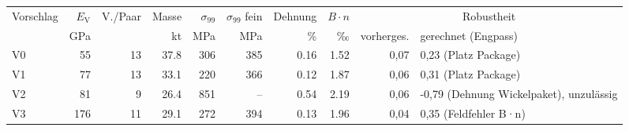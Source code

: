 \begin{tabular}{@{}lrrrrrrrrl@{}}\toprule
Vorschlag & $E_\text{V}$ & V./Paar & Masse & $\sigma_{99}$ & $\sigma_{99}$ fein & Dehnung & $B\cdot n$ & \multicolumn{2}{c}{Robustheit} \\
 & GPa & & kt & MPa & MPa & \% & ‰ & vorherges. & gerechnet (Engpass) \\\midrule
V0 & \num{55} & 13 & \num{37.8} & \num{306} & \num{385} & \num{0.16} & \num{1.52} & 0,07 & 0,23 (Platz Package) \\
V1 & \num{77} & 13 & \num{33.1} & \num{220} & \num{366} & \num{0.12} & \num{1.87} & 0,06 & 0,31 (Platz Package) \\
V2 & \num{81} & 9 & \num{26.4} & \num{851} & -- & \num{0.54} & \num{2.19} & 0,06 & -0,79 (Dehnung Wickelpaket), unzulässig \\
V3 & \num{176} & 11 & \num{29.1} & \num{272} & \num{394} & \num{0.13} & \num{1.96} & 0,04 & 0,35 (Feldfehler B·n) \\
\bottomrule\end{tabular}
